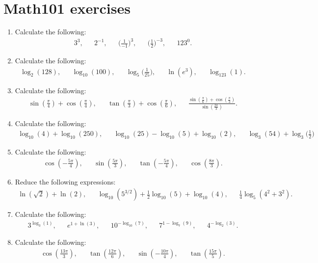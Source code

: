 \newpage
\section{Math101 exercises}
\begin{enumerate}
	\item Calculate the following:
	\begin{align*}
	3^3,&& 2^{-1}, &&\Big(\frac{1}{-1}\Big)^{3},&&\Big(\frac{1}{2}\Big)^{-3},&& 123^0.
	\end{align*}
	\item Calculate the following:
	\begin{align*}
	\log_2(128),&& \log_{10}(100),&& \log_5\Big(\frac{1}{25}\Big),&& \ln(e^3),&&\log_{123}(1).
	\end{align*}
	
	\item Calculate the following:
	\begin{align*}
	\sin(\frac{\pi}{4})+\cos(\frac{\pi}{4}),&& \tan(\frac{\pi}{3})+\cos(\frac{\pi}{6}),&& \frac{\sin(\frac{\pi}{6})+\cos(\frac{\pi}{3})}{\sin(\frac{2\pi}{3})}.
	\end{align*}
	

	\item Calculate the following:
	\begin{align*}
	\log_{10}(4)+\log_{10}(250),&&\log_{10}(25)-\log_{10}(5)+\log_{10}(2),&& \log_3(54)+\log_3\Big(\frac{1}{2}\Big)
	\end{align*}
	
	\item Calculate the following:
	\begin{align*}
	\cos(-\frac{5\pi}{4}),&& \sin(\frac{5\pi}{3}),&&\tan(-\frac{5\pi}{4}),&& \cos(\frac{8\pi}{3}).
	\end{align*}
	
	
	\item Reduce the following expressions:
	\begin{align*}
	\ln(\sqrt{2})+\ln(2),&& \log_{10}(5^{3/2})+\frac{1}{2}\log_{10}(5)+\log_{10}(4),&& \frac{1}{4}\log_5(4^2+3^2).
	\end{align*}
	
	
	\item Calculate the following:
	\begin{align*}
	3^{\log_3(1)},&&e^{1+\ln(3)},&& 10^{-\log_{10}(7)},&& 7^{1-\log_7(9)},&& 4^{-\log_2(3)}.
	\end{align*}
	
	\item Calculate the following:
	\begin{align*}
	\cos(\frac{13\pi}{3}),&& \tan(\frac{12\pi}{6}),&& \sin(-\frac{10\pi}{4}),&& \tan(\frac{15 \pi}{5}).
	\end{align*}
	

\end{enumerate}
